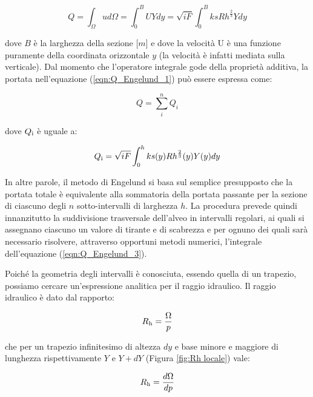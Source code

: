\documentclass[12pt]{article} %
\begin{document}
\begin{equation}
    Q=\int_{\Omega}^{} ud\Omega=\int_{0}^{B}UYdy=\sqrt{iF}\int_{0}^{B}ksRh^{\frac{2}{3}}Ydy
    \label{eqn:Q_Engelund_1}
\end{equation}

\noindent dove $B$ è la larghezza della sezione [$m$] e dove la velocità U è una funzione puramente della coordinata orizzontale $y$ (la velocità è infatti mediata sulla verticale).
Dal momento che l’operatore integrale gode della proprietà additiva, la portata nell’equazione (\ref{eqn:Q_Engelund_1}) può essere espressa come:

\begin{equation}
    Q=\sum_i^n Q_i
    \label{eqn:Q_Engelund_2}
\end{equation}

\noindent dove $Q\textsubscript{i}$ è uguale a:

\begin{equation}
    Q\textsubscript{i}=\sqrt{iF}\int_{0}^{h} ks(y)Rh^{\frac{2}{3}}(y)Y(y)dy
    \label{eqn:Q_Engelund_3}
\end{equation}

\noindent In altre parole, il metodo di Engelund si basa sul semplice presupposto che la portata totale è equivalente alla sommatoria della portata passante per la sezione di ciascuno degli $n$ sotto-intervalli di larghezza $h$. La procedura prevede quindi innanzitutto la suddivisione trasversale dell’alveo in intervalli regolari, ai quali si assegnano ciascuno un valore di tirante e di scabrezza e per ognuno dei quali sarà necessario risolvere, attraverso opportuni metodi numerici, l’integrale dell’equazione (\ref{eqn:Q_Engelund_3}).

\noindent Poiché la geometria degli intervalli è conosciuta, essendo quella di un trapezio, possiamo cercare un’espressione analitica per il raggio idraulico. Il raggio idraulico è dato dal rapporto:

\begin{equation}
    R\textsubscript{h}=\frac{\Omega}{p}
    \label{eqn:Rh_1}
\end{equation}


\noindent che per un trapezio infinitesimo di altezza $dy$ e base minore e maggiore di lunghezza rispettivamente $Y$ e $Y+dY$ (Figura \ref{fig:Rh locale}) vale:

\begin{equation}
    R\textsubscript{h}=\frac{d\Omega}{dp}
    \label{eqn:Rh_2}
\end{equation}
\end{document}
